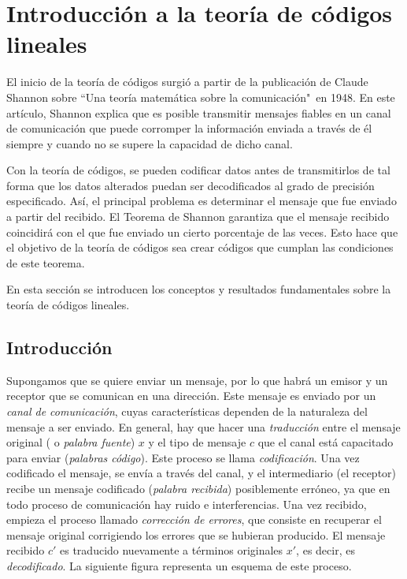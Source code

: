 
\chapter{Introducción a la teoría de códigos lineales}

El inicio de la teoría de códigos surgió a partir de la publicación de Claude Shannon sobre ``Una teoría matemática sobre la comunicación"\ en 1948. En este artículo, Shannon explica que es posible transmitir mensajes fiables en un canal de comunicación que puede corromper la información enviada a través de él siempre y cuando no se supere la capacidad de dicho canal.

Con la teoría de códigos, se pueden codificar datos antes de transmitirlos de tal forma que los datos alterados puedan ser decodificados al grado de precisión especificado. Así, el principal problema es determinar el mensaje que fue enviado a partir del recibido. El Teorema de Shannon garantiza que el mensaje recibido coincidirá con el que fue enviado un cierto porcentaje de las veces. Esto hace que el objetivo de la teoría de códigos sea crear códigos que cumplan las condiciones de este teorema.

En esta sección se introducen los conceptos y resultados fundamentales sobre la teoría de códigos lineales.

\section{Introducción}
Supongamos que se quiere enviar un mensaje, por lo que habrá un emisor y un receptor 
que se comunican en una dirección. Este mensaje es enviado por un \emph{canal de comunicación}, cuyas características dependen de la naturaleza del mensaje a ser enviado. En general, hay que hacer una \emph{traducción} entre el mensaje original ( o \emph{palabra fuente}) $x$ y el tipo de mensaje $c$ que el canal está capacitado para enviar (\emph{palabras código}). Este proceso se llama \emph{codificación}. Una vez codificado el mensaje, se envía a través del canal, y el intermediario (el receptor) recibe un mensaje codificado (\emph{palabra recibida}) posiblemente erróneo, ya que en todo proceso de comunicación hay ruido e interferencias. Una vez recibido, empieza el proceso llamado \emph{corrección de errores}, que consiste en recuperar el mensaje original corrigiendo los errores que se hubieran producido. El mensaje recibido $c'$ es traducido nuevamente a términos originales $x'$, es decir, es \emph{decodificado}. La siguiente figura representa un esquema de este proceso.

